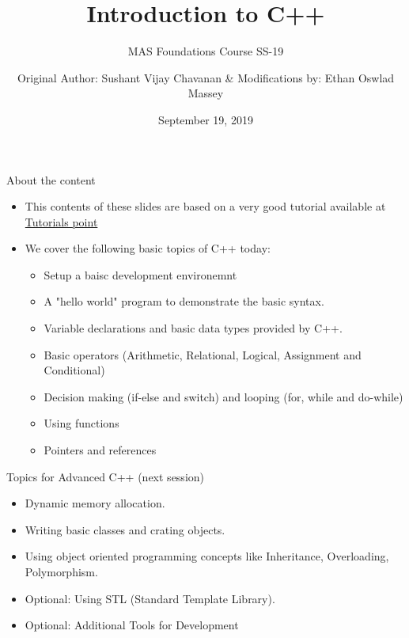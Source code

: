 \documentclass[aspectratio=169]{beamer}
\author[Chavan \& Massey]{Original Author: Sushant Vijay Chavanan \& Modifications by: Ethan Oswlad Massey }
\title{Introduction to C++}
\subtitle{MAS Foundations Course SS-19}
\institute[HBRS]{Hochschule Bonn-Rhein-Sieg}
\date{September 19, 2019}
\begin{document}
{
\begin{frame}
\titlepage
\end{frame}
}

\begin{frame}{About the content}
    \begin{itemize}
        \item This contents of these slides are based on a very good tutorial available at \href{https://www.tutorialspoint.com/cplusplus/index.htm}{Tutorials point}
        \item We cover the following basic topics of C++ today:
        \begin{itemize}
            \item Setup a baisc development environemnt
            \item A "hello world" program to demonstrate the basic syntax.
            \item Variable declarations and basic data types provided by C++.
            \item Basic operators (Arithmetic, Relational, Logical, Assignment and Conditional)
            \item Decision making (if-else and switch) and looping (for, while and do-while)
            \item Using functions
            \item Pointers and references
        \end{itemize}
    \end{itemize}
\end{frame}

\begin{frame}{Topics for Advanced C++ (next session)}
    \begin{itemize}
        \item Dynamic memory allocation.
        \item Writing basic classes and crating objects.
        \item Using object oriented programming concepts like Inheritance, Overloading, Polymorphism.
        \item Optional: Using STL (Standard Template Library).
        \item Optional: Additional Tools for Development
    \end{itemize}
\end{frame}
\end{document}
